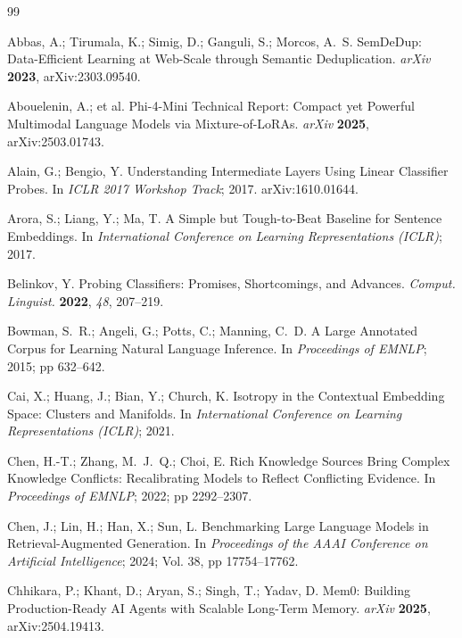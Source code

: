 \documentclass[journal=jcisd8,manuscript=article]{achemso}
\begin{document}
\begin{thebibliography}{99}

 Abbas, A.; Tirumala, K.; Simig, D.; Ganguli, S.; Morcos, A.~S. SemDeDup: Data-Efficient Learning at Web-Scale through Semantic Deduplication. \emph{arXiv} \textbf{2023}, arXiv:2303.09540.

 Abouelenin, A.; et al. Phi-4-Mini Technical Report: Compact yet Powerful Multimodal Language Models via Mixture-of-LoRAs. \emph{arXiv} \textbf{2025}, arXiv:2503.01743.

 Alain, G.; Bengio, Y. Understanding Intermediate Layers Using Linear Classifier Probes. In \emph{ICLR 2017 Workshop Track}; 2017. arXiv:1610.01644.

 Arora, S.; Liang, Y.; Ma, T. A Simple but Tough-to-Beat Baseline for Sentence Embeddings. In \emph{International Conference on Learning Representations (ICLR)}; 2017.

 Belinkov, Y. Probing Classifiers: Promises, Shortcomings, and Advances. \emph{Comput. Linguist.} \textbf{2022}, \emph{48}, 207--219.

 Bowman, S.~R.; Angeli, G.; Potts, C.; Manning, C.~D. A Large Annotated Corpus for Learning Natural Language Inference. In \emph{Proceedings of EMNLP}; 2015; pp 632--642.

 Cai, X.; Huang, J.; Bian, Y.; Church, K. Isotropy in the Contextual Embedding Space: Clusters and Manifolds. In \emph{International Conference on Learning Representations (ICLR)}; 2021.

 Chen, H.-T.; Zhang, M.~J.~Q.; Choi, E. Rich Knowledge Sources Bring Complex Knowledge Conflicts: Recalibrating Models to Reflect Conflicting Evidence. In \emph{Proceedings of EMNLP}; 2022; pp 2292--2307.

 Chen, J.; Lin, H.; Han, X.; Sun, L. Benchmarking Large Language Models in Retrieval-Augmented Generation. In \emph{Proceedings of the AAAI Conference on Artificial Intelligence}; 2024; Vol. 38, pp 17754--17762.

 Chhikara, P.; Khant, D.; Aryan, S.; Singh, T.; Yadav, D. Mem0: Building Production-Ready AI Agents with Scalable Long-Term Memory. \emph{arXiv} \textbf{2025}, arXiv:2504.19413.


\end{thebibliography}
\end{document}
